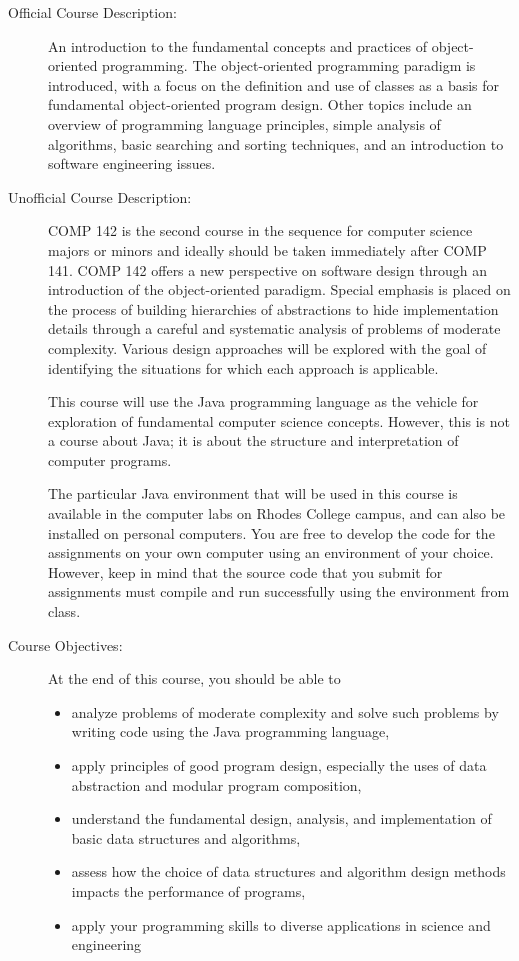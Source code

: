 \documentclass [letterpaper,11pt]{article}
\begin{document}
\begin{description}

\item[Official Course Description:]
An introduction to the fundamental concepts and practices of object-oriented programming. The object-oriented programming paradigm is introduced, with a focus on the definition and use of classes as a basis for fundamental object-oriented program design. Other topics include an overview of programming language principles, simple analysis of algorithms, basic searching and sorting techniques, and an introduction to software engineering issues.

\item[Unofficial Course Description:]
COMP 142 is the second course in the sequence for computer science majors or minors and ideally should be taken immediately after COMP 141. COMP 142 offers a new perspective on software design through an introduction of the object-oriented paradigm. Special emphasis is placed on the process of building hierarchies of abstractions to hide implementation details through a careful and systematic analysis of problems of moderate complexity. Various design approaches will be explored with the goal of identifying the situations for which each approach is applicable. 

This course will use the Java programming language as the vehicle for exploration of fundamental computer science concepts. However, this is not a course about Java; it is about the structure and interpretation of computer programs.

The particular Java environment that will be used in this course is available in the computer labs on Rhodes College campus, 
and can also be installed on personal computers.
You are free to develop the code for the assignments on your own computer using an environment of your choice. However, keep in mind that the source code that you submit for assignments must compile and run successfully using the environment from class.

\item[Course Objectives:]
At the end of this course, you should be able to
\begin{itemize} \setlength{\itemsep}{0em}\setlength{\parskip}{0pt}
	\item analyze problems of moderate complexity and solve such problems by writing code using the Java programming language,
	\item apply principles of good program design, especially the uses of data abstraction and modular program composition,
	\item understand the fundamental design, analysis, and implementation of basic data structures and algorithms,
	\item assess how the choice of data structures and algorithm design methods impacts the performance of programs,
	\item apply your programming skills to diverse applications in science and engineering
\end{itemize}





\end{description}
\end{document}
